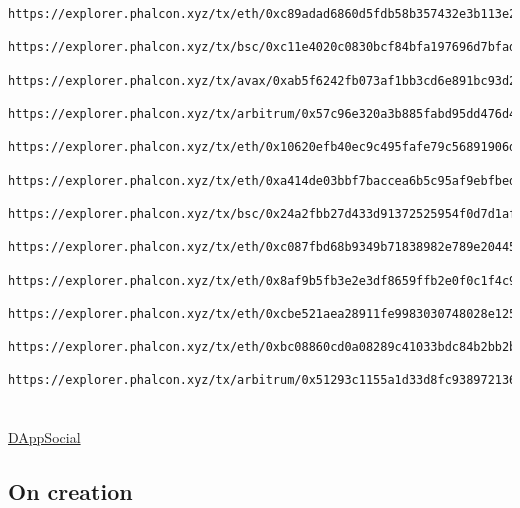 \begin{lstlisting}
https://explorer.phalcon.xyz/tx/eth/0xc89adad6860d5fdb58b357432e3b113e2ecf2c50f53ae18edcc70d3c7119e525

https://explorer.phalcon.xyz/tx/bsc/0xc11e4020c0830bcf84bfa197696d7bfad9ff503166337cb92ea3fade04007662

https://explorer.phalcon.xyz/tx/avax/0xab5f6242fb073af1bb3cd6e891bc93d247e748a69e599a3744ff070447acb20f,0x4425f757715e23d392cda666bc0492d9e5d5848ff89851a1821eab5ed12bb867

https://explorer.phalcon.xyz/tx/arbitrum/0x57c96e320a3b885fabd95dd476d43c0d0fb10500d940d9594d4a458471a87abe

https://explorer.phalcon.xyz/tx/eth/0x10620efb40ec9c495fafe79c56891906debd62fa4d7a5baacdefe351c663a2f2

https://explorer.phalcon.xyz/tx/eth/0xa414de03bbf7baccea6b5c95af9ebfbed43b1c3151debd29673df979a0f4b0b0

https://explorer.phalcon.xyz/tx/bsc/0x24a2fbb27d433d91372525954f0d7d1af7509547b9ada29cc6c078e732c6d075

https://explorer.phalcon.xyz/tx/eth/0xc087fbd68b9349b71838982e789e204454bfd00eebf9c8e101574376eb990d92

https://explorer.phalcon.xyz/tx/eth/0x8af9b5fb3e2e3df8659ffb2e0f0c1f4c90d5a80f4f6fccef143b823ce673fb60

https://explorer.phalcon.xyz/tx/eth/0xcbe521aea28911fe9983030748028e12541e347b8b6b974d026fa5065c22f0cf

https://explorer.phalcon.xyz/tx/eth/0xbc08860cd0a08289c41033bdc84b2bb2b0c54a51ceae59620ed9904384287a38

https://explorer.phalcon.xyz/tx/arbitrum/0x51293c1155a1d33d8fc9389721362044c3a67e0ac732b3a6ec7661d47b03df9f
\end{lstlisting}

\section{}

\href{https://explorer.phalcon.xyz/tx/eth/0xbd72bccec6dd824f8cac5d9a3a2364794c9272d7f7348d074b580e3c6e44312e}{DAppSocial}

\subsection{On creation}


